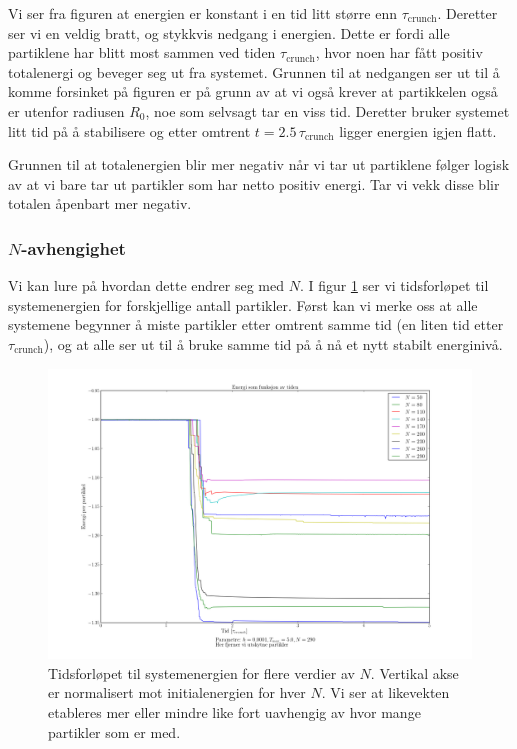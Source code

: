 \documentclass[11pt]{article}
\begin{document}
\begin{multicols}{2}
Vi ser fra figuren at energien er konstant i en tid litt større enn
$\tau_\text{crunch}$. Deretter ser vi en veldig bratt, og stykkvis
nedgang i energien. Dette er fordi alle partiklene har blitt most
sammen ved tiden $\tau_\text{crunch}$, hvor noen har fått positiv
totalenergi og beveger seg ut fra systemet. Grunnen til at nedgangen
ser ut til å komme forsinket på figuren er på grunn av at vi også
krever at partikkelen også er utenfor radiusen $R_0$, noe som selvsagt
tar en viss tid. Deretter bruker systemet litt tid på å stabilisere
og etter omtrent $t = 2.5\,\tau_\text{crunch}$ ligger energien igjen
flatt. 

Grunnen til at totalenergien blir mer negativ når vi tar ut partiklene
følger logisk av at vi bare tar ut partikler som har netto positiv
energi. Tar vi vekk disse blir totalen åpenbart mer negativ. 

\subsubsection{$N$-avhengighet}
Vi kan lure på hvordan dette endrer seg med $N$. I figur
\ref{fig:energy-many-N} ser vi tidsforløpet til systemenergien for
forskjellige antall partikler. Først kan vi merke oss at alle
systemene begynner å miste partikler etter omtrent samme tid (en liten
tid etter $\tau_\text{crunch}$), og at alle ser ut til å bruke samme
tid på å nå et nytt stabilt energinivå. 

\end{multicols}
\begin{figure}[!ht]
  \centering
  \includegraphics[width=\textwidth]{../fig/energy_plot_with_ejection_many_N.png}
  \caption{\label{fig:energy-many-N} Tidsforløpet til systemenergien
    for flere verdier av $N$. Vertikal akse er normalisert mot
    initialenergien for hver $N$. Vi ser at likevekten etableres mer eller
  mindre like fort uavhengig av hvor mange partikler som er med.}
\end{figure}
\end{document}
